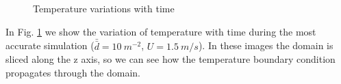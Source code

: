 \begin{figure}[!h]
\centering
\subfloat[t = 25 s]
{\label{fig:0701}%
\texttt{[image: 0701]}} \quad 
\subfloat[t = 150 s]
{\label{fig:0806}%
\texttt{[image: 0806]}} \quad  
\subfloat[t = 300 s]
{\label{fig:0912}%
\texttt{[image: 0912]}} \\  
\subfloat[t = 450 s]
{\label{fig:1018}%
\texttt{[image: 1018]}} \quad  
\subfloat[t = 600 s]
{\label{fig:1124}%
\texttt{[image: 1124]}} \\  
\caption[Temperature variations with time]{Temperature variations with time}
\label{fig:simulations2}
\end{figure}

In Fig. \ref{fig:simulations2} we show the variation of temperature with time
during the most accurate simulation ($\bar{\bar{d}} = 10 ~m^{-2}$, $U = 1.5
~m/s$).
In these images the domain is sliced along the z axis, so we can see how the
temperature boundary condition propagates through the domain.
